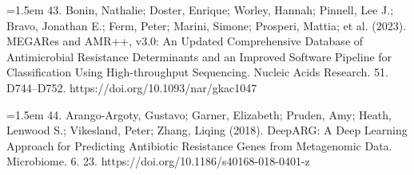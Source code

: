 \documentclass[11pt]{article}
\begin{document}
\hangindent=1.5em  43. Bonin, Nathalie; Doster, Enrique; Worley, Hannah; Pinnell, Lee J.; Bravo, Jonathan E.; Ferm, Peter; Marini, Simone; Prosperi, Mattia; et al. (2023). MEGARes and AMR++, v3.0: An Updated Comprehensive Database of Antimicrobial Resistance Determinants and an Improved Software Pipeline for Classification Using High-throughput Sequencing. Nucleic Acids Research. 51. D744--D752. https://doi.org/10.1093/nar/gkac1047\par

\hangindent=1.5em  44. Arango-Argoty, Gustavo; Garner, Elizabeth; Pruden, Amy; Heath, Lenwood S.; Vikesland, Peter; Zhang, Liqing (2018). DeepARG: A Deep Learning Approach for Predicting Antibiotic Resistance Genes from Metagenomic Data. Microbiome. 6. 23. https://doi.org/10.1186/s40168-018-0401-z\par
\end{document}
